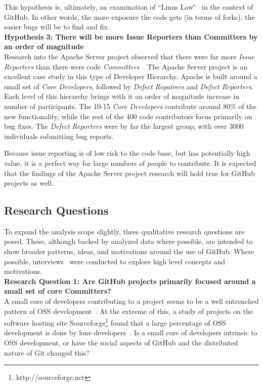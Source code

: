 \documentclass{proc}
\begin{document}
This hypothesis is, ultimately, an examination of ``Linus Law"~\cite{raymond1999cathedral} in the context of GitHub. In other words, the more exposure the code gets (in terms of forks), the easier bugs will be to find and fix.\\

\noindent \textbf{Hypothesis 3: There will be more Issue Reporters than Committers by an order of magnitude}\\
Research into the Apache Server project observed that there were far more \emph{Issue Reporters} than there were code \emph{Committers}~\cite{mockus2000case}. The Apache Server project is an excellent case study in this type of Developer Hierarchy. Apache is built around a small set of {\it Core Developers}, followed by {\it Defect Repairers} and {\it Defect Reporters}. Each level of this hierarchy brings with it an order of magnitude increase in number of participants. The 10-15 {\it Core Developers} contribute around 80\% of the new functionality, while the rest of the 400 code contributors focus primarily on bug fixes. The {\it Defect Reporters} were by far the largest group, with over 3000 individuals submitting bug reports.

Because issue reporting is of low risk to the code base, but has potentially high value, it is a perfect way for large numbers of people to contribute. It is expected that the findings of the Apache Server project research will hold true for GitHub projects as well.

\subsection{Research Questions}
To expand the analysis scope slightly, three qualitative research questions are posed. These, although backed by analyzed data where possible, are intended to show broader patterns, ideas, and motivations around the use of GitHub. Where possible, interviews~\cite{begel2013social} were conducted to explore high level concepts and motivations.\\

\noindent \textbf{Research Question 1: Are GitHub projects primarily focused around a small set of core Committers?}\\
A small core of developers contributing to a project seems to be a well entrenched pattern of OSS development~\cite{mockus2000case,mockus2002two,krishnamurthy2002cave}. At the extreme of this, a study of projects on the software hosting site Sourceforge\footnote{http://sourceforge.net} found that a large percentage of OSS development is done by lone developers~\cite{krishnamurthy2002cave}. Is a small core of developers intrinsic to OSS development, or have the social aspects of GitHub and the distributed nature of Git changed this?\\
\end{document}
